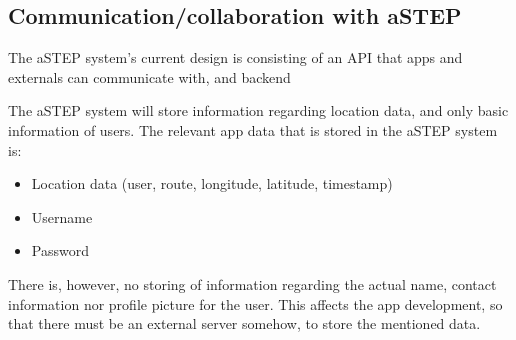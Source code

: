 \subsection{Communication/collaboration with aSTEP}
The aSTEP system's current design is consisting of an API that apps and externals can communicate with, and backend 

The aSTEP system will store information regarding location data, and only basic information of users. The relevant app data that is stored in the aSTEP system is:
\begin{itemize}
	\item Location data (user, route, longitude, latitude, timestamp)
	\item Username
	\item Password
\end{itemize}

There is, however, no storing of information regarding the actual name, contact information nor profile picture for the user. This affects the app development, so that there must be an external server somehow, to store the mentioned data. 




